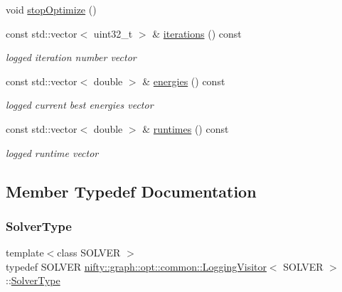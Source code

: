\begin{DoxyCompactItemize}
\item 
void \hyperlink{classnifty_1_1graph_1_1opt_1_1common_1_1LoggingVisitor_a744a5519377c2f34057c1e79867f2bc5}{stop\+Optimize} ()
\item 
const std\+::vector$<$ uint32\+\_\+t $>$ \& \hyperlink{classnifty_1_1graph_1_1opt_1_1common_1_1LoggingVisitor_a7bfbbd9384969ab69e3ac7dcdb0481b3}{iterations} () const
\begin{DoxyCompactList}\small\item\em logged iteration number vector \end{DoxyCompactList}\item 
const std\+::vector$<$ double $>$ \& \hyperlink{classnifty_1_1graph_1_1opt_1_1common_1_1LoggingVisitor_ae48f0bf94c4693a7f0c16bca10540373}{energies} () const
\begin{DoxyCompactList}\small\item\em logged current best energies vector \end{DoxyCompactList}\item 
const std\+::vector$<$ double $>$ \& \hyperlink{classnifty_1_1graph_1_1opt_1_1common_1_1LoggingVisitor_a4cef121f38488dc23115927768c7b8b3}{runtimes} () const
\begin{DoxyCompactList}\small\item\em logged runtime vector \end{DoxyCompactList}\end{DoxyCompactItemize}


\subsection{Member Typedef Documentation}
\mbox{\label{classnifty_1_1graph_1_1opt_1_1common_1_1LoggingVisitor_af6aa5fbf9acd4c1fa02fa34c73b90c1b}} 
\subsubsection{\texorpdfstring{Solver\+Type}{SolverType}}
{\footnotesize\ttfamily template$<$class S\+O\+L\+V\+ER $>$ \\
typedef S\+O\+L\+V\+ER \hyperlink{classnifty_1_1graph_1_1opt_1_1common_1_1LoggingVisitor}{nifty\+::graph\+::opt\+::common\+::\+Logging\+Visitor}$<$ S\+O\+L\+V\+ER $>$\+::\hyperlink{classnifty_1_1graph_1_1opt_1_1common_1_1LoggingVisitor_af6aa5fbf9acd4c1fa02fa34c73b90c1b}{Solver\+Type}}

